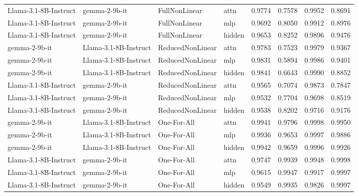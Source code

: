 {\begin{tabularx}{\textwidth}{XXXlcccc}
Llama-3.1-8B-Instruct & gemma-2-9b-it & FullNonLinear & attn & 0.9774 & 0.7578 & 0.9952 & 0.8691 \\
Llama-3.1-8B-Instruct & gemma-2-9b-it & FullNonLinear & mlp & 0.9692 & 0.8050 & 0.9912 & 0.8976 \\
Llama-3.1-8B-Instruct & gemma-2-9b-it & FullNonLinear & hidden & 0.9653 & 0.8252 & 0.9896 & 0.9476 \\
\midrule
gemma-2-9b-it & Llama-3.1-8B-Instruct & ReducedNonLinear & attn & 0.9783 & 0.7523 & 0.9979 & 0.9367 \\
gemma-2-9b-it & Llama-3.1-8B-Instruct & ReducedNonLinear & mlp & 0.9831 & 0.5894 & 0.9986 & 0.9401 \\
gemma-2-9b-it & Llama-3.1-8B-Instruct & ReducedNonLinear & hidden & 0.9841 & 0.6643 & 0.9990 & 0.8852 \\
Llama-3.1-8B-Instruct & gemma-2-9b-it & ReducedNonLinear & attn & 0.9565 & 0.7074 & 0.9873 & 0.7847 \\
Llama-3.1-8B-Instruct & gemma-2-9b-it & ReducedNonLinear & mlp & 0.9532 & 0.7704 & 0.9698 & 0.8519 \\
Llama-3.1-8B-Instruct & gemma-2-9b-it & ReducedNonLinear & hidden & 0.9538 & 0.8202 & 0.9716 & 0.9176 \\
\midrule
gemma-2-9b-it & Llama-3.1-8B-Instruct & One-For-All & attn & 0.9941 & 0.9796 & 0.9998 & 0.9950 \\
gemma-2-9b-it & Llama-3.1-8B-Instruct & One-For-All & mlp & 0.9936 & 0.9653 & 0.9997 & 0.9886 \\
gemma-2-9b-it & Llama-3.1-8B-Instruct & One-For-All & hidden & 0.9942 & 0.9659 & 0.9996 & 0.9926 \\
Llama-3.1-8B-Instruct & gemma-2-9b-it & One-For-All & attn & 0.9747 & 0.9939 & 0.9948 & 0.9998 \\
Llama-3.1-8B-Instruct & gemma-2-9b-it & One-For-All & mlp & 0.9615 & 0.9947 & 0.9917 & 0.9997 \\
Llama-3.1-8B-Instruct & gemma-2-9b-it & One-For-All & hidden & 0.9549 & 0.9935 & 0.9826 & 0.9997 \\
\end{tabularx}
}

